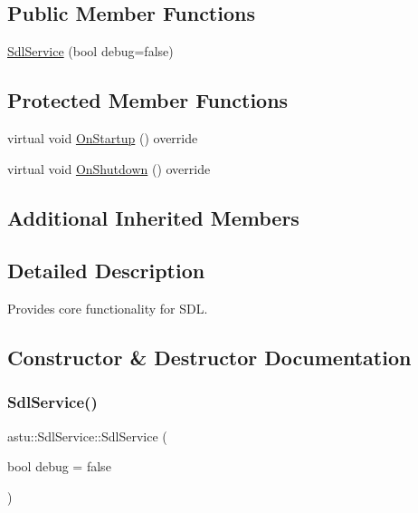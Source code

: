 \subsection*{Public Member Functions}
\begin{DoxyCompactItemize}
\item 
\hyperlink{classastu_1_1SdlService_a10f72400e58e333f831d9a05d83b2d5b}{Sdl\+Service} (bool debug=false)
\end{DoxyCompactItemize}
\subsection*{Protected Member Functions}
\begin{DoxyCompactItemize}
\item 
virtual void \hyperlink{classastu_1_1SdlService_a2fcb46537de794ab6e4f5e043b26ff60}{On\+Startup} () override
\item 
virtual void \hyperlink{classastu_1_1SdlService_a20d53237efd1c717d773a8ff121b093b}{On\+Shutdown} () override
\end{DoxyCompactItemize}
\subsection*{Additional Inherited Members}


\subsection{Detailed Description}
Provides core functionality for S\+DL. 

\subsection{Constructor \& Destructor Documentation}
\mbox{\label{classastu_1_1SdlService_a10f72400e58e333f831d9a05d83b2d5b}} 
\subsubsection{\texorpdfstring{Sdl\+Service()}{SdlService()}}
{\footnotesize\ttfamily astu\+::\+Sdl\+Service\+::\+Sdl\+Service (\begin{DoxyParamCaption}\item[{bool}]{debug = {\ttfamily false} }\end{DoxyParamCaption})}

